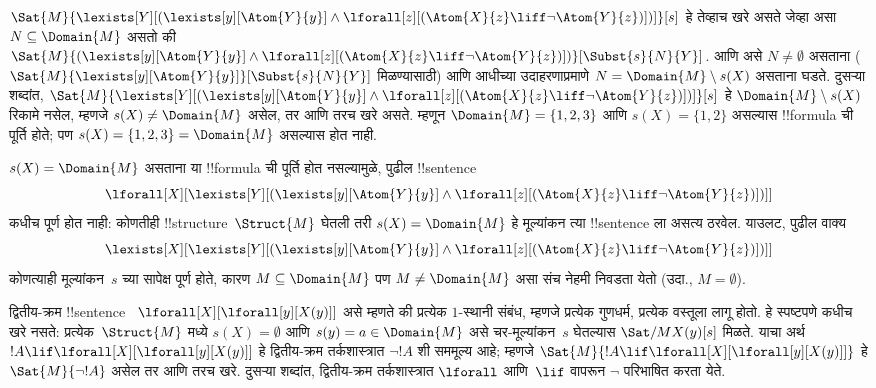 \documentclass[../../../include/open-logic-section]{subfiles}
\begin{document}
\begin{ex}
  $\Sat{M}{\lexists[Y][(\lexists[y][\Atom{Y}{y}] \land
  \lforall[z][(\Atom{X}{z} \liff \lnot \Atom{Y}{z})])]}[s]$
  हे तेव्हाच खरे
  असते जेव्हा
  असा $N \subseteq \Domain{M}$
  असतो की
  $\Sat{M}{(\lexists[y][\Atom{Y}{y}] \land \lforall[z][(\Atom{X}{z}
  \liff \lnot \Atom{Y}{z})])}[\Subst{s}{N}{Y}]$.
  आणि असे
  $N \neq \emptyset$
  असताना
  ($\Sat{M}{\lexists[y][\Atom{Y}{y}]}[\Subst{s}{N}{Y}]$
  मिळण्यासाठी)
  आणि आधीच्या
  उदाहरणाप्रमाणे
  $N = \Domain{M} \setminus s(X)$
  असताना घडते.
  दुसऱ्या शब्दांत,
  $\Sat{M}{\lexists[Y][(\lexists[y][\Atom{Y}{y}] \land
  \lforall[z][(\Atom{X}{z} \liff \lnot \Atom{Y}{z})])]}[s]$
  हे
  $\Domain{M} \setminus s(X)$
  रिकामे नसेल,
  म्हणजे
  $s(X) \neq
  \Domain{M}$
  असेल, तर आणि
  तरच खरे असते.
  म्हणून
  $\Domain{M}
  = \{1, 2, 3\}$
  आणि
  $s(X) = \{1, 2\}$
  असल्यास
  !!{formula}
  ची पूर्ति होते;
  पण
  $s(X) = \{1, 2, 3\}
  = \Domain{M}$
  असल्यास होत नाही.

  $s(X) = \Domain{M}$
  असताना या
  !!{formula}
  ची पूर्ति
  होत नसल्यामुळे,
  पुढील
  !!{sentence}
  \[
  \lforall[X][\lexists[Y][(\lexists[y][\Atom{Y}{y}] \land
      \lforall[z][(\Atom{X}{z} \liff \lnot \Atom{Y}{z})])]]
  \]
  कधीच पूर्ण
  होत नाही:
  कोणतीही
  !!{structure}~$\Struct{M}$
  घेतली तरी
  $s(X) = \Domain{M}$
  हे मूल्यांकन
  त्या
  !!{sentence}
  ला असत्य
  ठरवेल.
  याउलट,
  पुढील वाक्य
  \[
  \lexists[X][\lexists[Y][(\lexists[y][\Atom{Y}{y}] \land
      \lforall[z][(\Atom{X}{z} \liff \lnot \Atom{Y}{z})])]]
  \]
  कोणत्याही
  मूल्यांकन~$s$
  च्या सापेक्ष
  पूर्ण होते,
  कारण
  $M \subseteq \Domain{M}$
  पण
  $M \neq \Domain{M}$
  असा संच नेहमी
  निवडता येतो
  (उदा.,
  $M = \emptyset$).
\end{ex}

\begin{ex}
  द्वितीय-क्रम
  !!{sentence}~
  $\lforall[X][\lforall[y][X(y)]]$
  असे म्हणते की
  प्रत्येक
  $1$-स्थानी
  संबंध, म्हणजे
  प्रत्येक
  गुणधर्म, प्रत्येक
  वस्तूला लागू
  होतो.
  हे स्पष्टपणे
  कधीच खरे नसते:
  प्रत्येक~$\Struct{M}$
  मध्ये
  $s(X) = \emptyset$
  आणि
  $s(y) = a \in
  \Domain{M}$
  असे चर-मूल्यांकन~$s$
  घेतल्यास
  $\Sat/{M}{X(y)}[s]$
  मिळते.
  याचा अर्थ
  $!A \lif
  \lforall[X][\lforall[y][X(y)]]$
  हे द्वितीय-क्रम
  तर्कशास्त्रात
  $\lnot !A$
  शी सममूल्य
  आहे; म्हणजे
  $\Sat{M}{!A \lif
  \lforall[X][\lforall[y][X(y)]]}$
  हे
  $\Sat{M}{\lnot !A}$
  असेल तर आणि
  तरच खरे.
  दुसऱ्या शब्दांत,
  द्वितीय-क्रम
  तर्कशास्त्रात
  $\lforall$
  आणि~$\lif$
  वापरून
  $\lnot$
  परिभाषित
  करता येते.
\end{ex}
\end{document}
